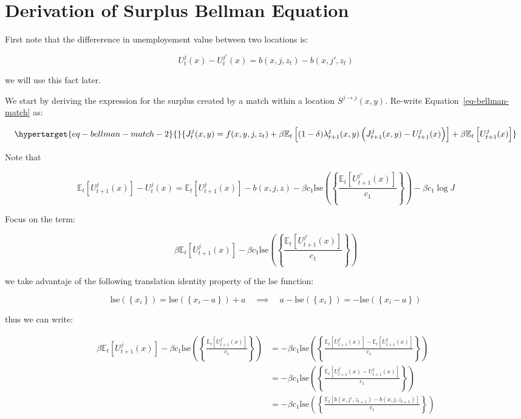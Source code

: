 \documentclass[
  letterpaper,
  DIV=11,
  numbers=noendperiod]{scrreprt}
\begin{document}
\hypertarget{sec-appendix_surplus}{%
\chapter{Derivation of Surplus Bellman
Equation}\label{sec-appendix_surplus}}

First note that the differerence in unemployement value between two
locations is:

\[U^{j}_{t}(x) - U^{j'}_{t}(x) = b(x,j,z_t) - b(x,j',z_t) \]

we will use this fact later.

We start by deriving the expression for the surplus created by a match
within a location \(S^{j\to j}(x,y)\). Re-write
Equation~\ref{eq-bellman-match} as:

\begin{equation}\protect\hypertarget{eq-bellman-match-2}{}{J^j_t(x,y) = f(x,y,j,z_t) + \beta \mathbb{E}_t\left[(1-\delta)\lambda^j_{t+1}(x,y)\left(J^j_{t+1}(x,y)-U_{t+1}^j(x)\right) \right]+ \beta \mathbb{E}_t\left[U^j_{t+1}(x)\right]}\label{eq-bellman-match-2}\end{equation}

Note that

\[\mathbb{E}_t\left[U^j_{t+1}(x)\right] - U^j_{t}(x) = \mathbb{E}_t\left[U^j_{t+1}(x)\right] - b(x,j,z)-\beta c_{1}\text{lse}\left(\left\{\frac{\mathbb{E}_{t}[U^{j'}_{t+1}(x)]}{c_{1}}\right\}\right) - \beta c_{1}\log{J}\]

Focus on the term:

\[\beta \mathbb{E}_t\left[U^j_{t+1}(x)\right] - \beta c_{1}\text{lse}\left(\left\{\frac{\mathbb{E}_{t}[U^{j'}_{t+1}(x)]}{c_{1}}\right\}\right)\]

we take advantaje of the following translation identity property of the
\(\text{lse}\) function:

\[\text{lse}\left(\left\{x_{i}\right\}\right)=\text{lse}\left(\left\{x_{i}-a\right\}\right)+a \quad \implies \quad a - \text{lse}\left(\left\{x_{i}\right\}\right) = - \text{lse}\left(\left\{x_{i}-a\right\}\right)\]

thus we can write:

\begin{align*}
  \beta \mathbb{E}_t\left[U^j_{t+1}(x)\right] - \beta c_{1}\text{lse}\left(\left\{\frac{\mathbb{E}_{t}[U^{j'}_{t+1}(x)]}{c_{1}}\right\}\right) &= - \beta c_{1}\text{lse}\left(\left\{\frac{\mathbb{E}_{t}[U^{j'}_{t+1}(x)]-\mathbb{E}_t\left[U^j_{t+1}(x)\right]}{c_{1}}\right\}\right)\\
  & = - \beta c_{1}\text{lse}\left(\left\{\frac{\mathbb{E}_{t}\left[U^{j'}_{t+1}(x)-U^j_{t+1}(x)\right]}{c_{1}} \right\}\right) \\
  & = - \beta c_{1}\text{lse}\left(\left\{\frac{\mathbb{E}_{t}\left[b(x,j',z_{t+1}) - b(x,j,z_{t+1})\right]}{c_{1}} \right\}\right) 
\end{align*}
\end{document}
